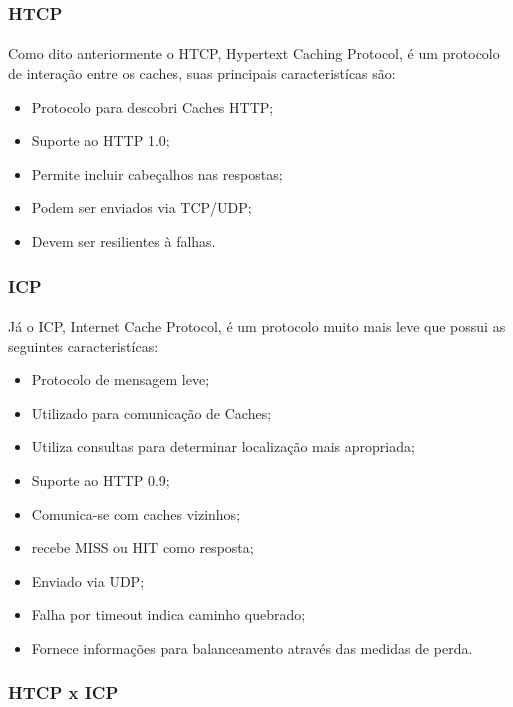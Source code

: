 \subsubsection{HTCP}
\label{section:HTCP}
\paragraph{} Como dito anteriormente o HTCP, Hypertext Caching Protocol, \'e um protocolo de intera\c{c}\~ao entre os caches, suas principais caracterist\'icas s\~ao:
\begin{itemize}
\item Protocolo para descobri Caches HTTP;
\item Suporte ao HTTP 1.0;
\item Permite incluir cabeçalhos nas respostas;
\item Podem ser enviados via TCP/UDP;
\item Devem ser resilientes \`a falhas.
\end{itemize}

\subsubsection{ICP}
\label{section:ICP}
\paragraph{} J\'a o ICP, Internet Cache Protocol, \'e um protocolo muito mais leve que possui as seguintes caracterist\'icas:
\begin{itemize}
\item Protocolo de mensagem leve;
\item Utilizado para comunica\c{c}\~ao de Caches;
\item Utiliza consultas para determinar localiza\c{c}\~ao mais apropriada;
\item Suporte ao HTTP 0.9;
\item Comunica-se com caches vizinhos;
\item recebe MISS ou HIT como resposta;
\item Enviado via UDP;
\item Falha por timeout indica caminho quebrado;
\item Fornece informa\c{c}\~oes para balanceamento atrav\'es das medidas de perda.
\end{itemize}

\subsubsection{HTCP x ICP}
